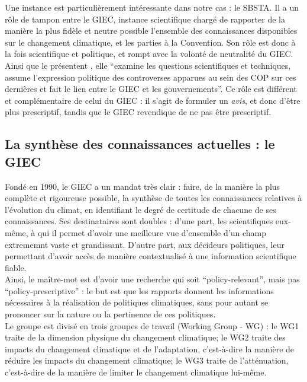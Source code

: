 Une instance est particulièrement intéressante dans notre cas : le \Gls{SBSTA}. Il a un rôle de tampon entre le \Gls{GIEC}, instance scientifique chargé de rapporter de la manière la plus fidèle et neutre possible l'ensemble des connaissances disponibles sur le changement climatique, et les parties à la Convention. Son rôle est donc à la fois scientifique et politique, et rompt avec la volonté de neutralité du \Gls{GIEC}. Ainsi que le présentent \textcite{aykut_gouverner_nodate}, elle \enquote{examine les questions scientifiques et techniques, assume l’expression politique des controverses apparues au sein des COP sur ces dernières et fait le lien entre le \Gls{GIEC} et les gouvernements}. Ce rôle est différent et complémentaire de celui du \Gls{GIEC} : il s'agit de formuler un \emph{avis}, et donc d'être plus prescriptif, tandis que le \Gls{GIEC} revendique de ne pas être prescriptif.  \\




\subsection{La synthèse des connaissances actuelles : le GIEC}
\label{sect:1.2.3}

Fondé en 1990, le \Gls{GIEC} a un mandat très clair : faire, de la manière la plus complète et rigoureuse possible, la synthèse de toutes les connaissances relatives à l'évolution du climat, en identifiant le degré de certitude de chacune de ses connaissances. Ses destinataires sont doubles : d'une part, les scientifiques eux-même, à qui il permet d'avoir une meilleure vue d'ensemble d'un champ extrememnt vaste et grandissant. D'autre part, aux décideurs politiques, leur permettant d'avoir accès de manière contextualisé à une information scientifique fiable. \\

Ainsi, le maître-mot est d'avoir une recherche qui soit \enquote{policy-relevant}, mais pas \enquote{policy-prescriptive} : le but est que les rapports donnent les informations nécessaires à la réalisation de politiques climatiques, sans pour autant se prononcer sur la nature ou la pertinence de ces politiques. \\

Le groupe est divisé en trois groupes de travail (Working Group - WG)  : le WG1 traite de la dimension physique du changement climatique; le WG2 traite des impacts du changement climatique et de l'adaptation, c'est-à-dire la manière de réduire les impacts du changement climatique; le WG3 traite de l'atténuation, c'est-à-dire de la manière de limiter le changement climatique lui-même. 



